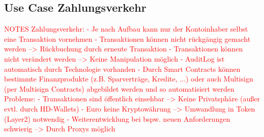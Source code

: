 \noindent

\subsection{Use Case Zahlungsverkehr}




\begin{flushleft}
    \textcolor{red}{NOTES Zahlungsverkehr:\break
    - Je nach Aufbau kann nur der Kontoinhaber selbst eine Transaktion vornehmen\break
    - Transaktionen können nicht rückgängig gemacht werden --> Rückbuchung durch erneute Transaktion\break
    - Transaktionen können nicht verändert werden --> Keine Manipulation möglich\break
    - AuditLog ist automatisch durch Technologie vorhanden\break
    - Durch Smart Contracts können bestimmte Finanzprodukte (z.B. Sparverträge, Kredite, ...) oder auch Multisign (per Multisign Contracts) abgebildet werden und so automatisiert werden\break
    Probleme:\break
    - Transaktionen sind öffentlich einsehbar --> Keine Privatsphäre (außer evtl. durch HD-Wallets)\break
    - Euro keine Kryptowährung --> Umwandlung in Token (Layer2) notwendig\break
    - Weiterentwicklung bei bspw. neuen Anforderungen schwierig --> Durch Proxys möglich}
\end{flushleft}

